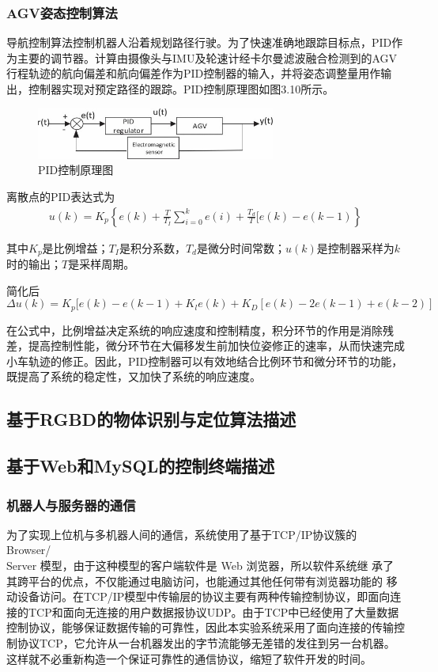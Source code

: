 \documentclass[cs4size,a4paper]{ctexart}
\numberwithin{equation}{section}
\numberwithin{table}{section}
\numberwithin{figure}{section}
\begin{document}
\subsubsection{AGV姿态控制算法}
导航控制算法控制机器人沿着规划路径行驶。为了快速准确地跟踪目标点，PID作为主要的调节器\cite{8623691}。计算由摄像头与IMU及轮速计经卡尔曼滤波融合检测到的AGV行程轨迹的航向偏差和航向偏差作为PID控制器的输入，并将姿态调整量用作输出，控制器实现对预定路径的跟踪。PID控制原理图如图3.10所示。
\begin{figure}[H]
    \centering
    \includegraphics[width=0.7\textwidth]{figure/PIDcontroller.jpg}
    \caption{PID控制原理图}
\end{figure}
离散点的PID表达式为
\begin{align}
    u(k)=K_{p} \left\{e(k)+\frac{T}{T_{I}}\sum\limits_{i=0}^{k}e(i)+\frac{T_{d}}{T}[e(k)-e(k-1)\right\}
\end{align}

其中$K_{p}$是比例增益；$T_{I}$是积分系数，$T_{d}$是微分时间常数；$u(k)$是控制器采样为$k$时的输出；$T$是采样周期。

简化后
\begin{equation*}
    \Delta u(k)=K_{p}[e(k)-e(k-1)+K_{l}e(k)+K_{D}[e(k)-2e(k-1)+e(k-2)]
\end{equation*}

在公式中，比例增益决定系统的响应速度和控制精度，积分环节的作用是消除残差，提高控制性能，微分环节在大偏移发生前加快位姿修正的速率，从而快速完成小车轨迹的修正。因此，PID控制器可以有效地结合比例环节和微分环节的功能，既提高了系统的稳定性，又加快了系统的响应速度。

\subsection{基于RGBD的物体识别与定位算法描述}



\subsection{基于Web和MySQL的控制终端描述}
\subsubsection{机器人与服务器的通信}
为了实现上位机与多机器人间的通信，系统使用了基于TCP/IP协议簇的 Browser/ \\Server 模型，由于这种模型的客户端软件是 Web 浏览器，所以软件系统继 承了其跨平台的优点，不仅能通过电脑访问，也能通过其他任何带有浏览器功能的 移动设备访问。在TCP/IP模型中传输层的协议主要有两种传输控制协议，即面向连 接的TCP和面向无连接的用户数据报协议UDP。由于TCP中已经使用了大量数据 控制协议，能够保证数据传输的可靠性，因此本实验系统采用了面向连接的传输控 制协议TCP，它允许从一台机器发出的字节流能够无差错的发往到另一台机器。这样就不必重新构造一个保证可靠性的通信协议，缩短了软件开发的时间。
\end{document}

